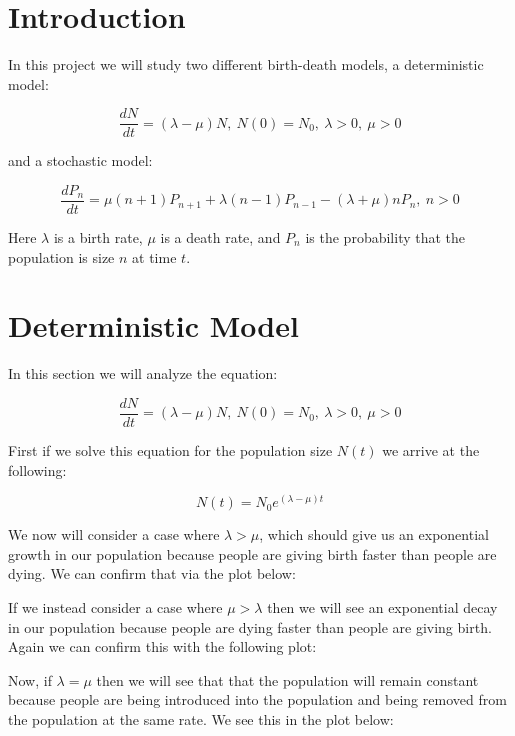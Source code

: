 \documentclass[11pt, oneside]{article}   	%
\begin{document}
\section{Introduction}

In this project we will study two different birth-death models, a deterministic model:

$$\frac{dN}{dt} = (\lambda -\mu)N, \ N(0)=N_0, \ \lambda > 0, \ \mu > 0$$

and a stochastic model:

$$\frac{dP_n}{dt} = \mu (n+1)P_{n+1}+\lambda (n-1)P_{n-1}-(\lambda+\mu)nP_n, \ n>0$$

Here $\lambda$ is a birth rate, $\mu$ is a death rate, and $P_n$ is the probability that the population is size $n$ at time $t$.

\section{Deterministic Model}

In this section we will analyze the equation:

$$\frac{dN}{dt} = (\lambda -\mu)N, \ N(0)=N_0, \ \lambda > 0, \ \mu > 0$$

First if we solve this equation for the population size $N(t)$ we arrive at the following:

$$N(t) = N_0 e^{(\lambda-\mu)t}$$

We now will consider a case where $\lambda > \mu$, which should give us an exponential growth in our population because people are giving birth faster than people are dying.
We can confirm that via the plot below:


If we instead consider a case where $\mu > \lambda$ then we will see an exponential decay in our population because people are dying faster than people are giving birth.
Again we can confirm this with the following plot:


Now, if $\lambda = \mu$ then we will see that that the population will remain constant because people are being introduced into the population and being removed from the population at the same rate.
We see this in the plot below:
\end{document}
